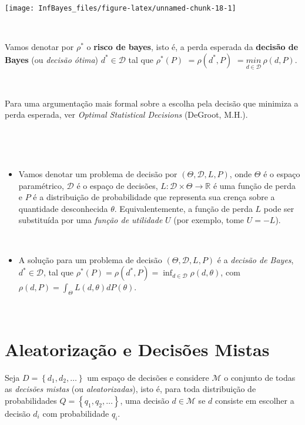 \documentclass[
]{book}
\providecommand{\tightlist}{%
  \setlength{\itemsep}{0pt}\setlength{\parskip}{0pt}}
\begin{document}
\begin{center}\texttt{[image: InfBayes\_files/figure-latex/unnamed-chunk-18-1]} \end{center}

\(~\)

Vamos denotar por \(\rho^*\) o \textbf{risco de bayes}, isto é, a perda esperada da \textbf{decisão de Bayes} (ou \emph{decisão ótima}) \(d^*\in \mathcal{D}\) tal que \(\rho^*(P)\) \(=\rho(d^*,P)\) \(=\underset{d\in\mathcal{D}}{min}~\rho(d,P)\).

\(~\)

Para uma argumentação mais formal sobre a escolha pela decisão que minimiza a perda esperada, ver \emph{Optimal Statistical Decisions} (DeGroot, M.H.).

\(~\)

\(~\)

\begin{itemize}
\tightlist
\item
  Vamos denotar um problema de decisão por \(\left(\Theta, \mathcal{D}, L, P\right)\), onde \(\Theta\) é o espaço paramétrico, \(\mathcal{D}\) é o espaço de decisões, \(L: \mathcal{D} \times \Theta \longrightarrow \mathbb{R}\) é uma função de perda e \(P\) é a distribuição de probabilidade que representa sua crença sobre a quantidade desconhecida \(\theta\). Equivalentemente, a função de perda \(L\) pode ser substituída por uma \emph{função de utilidade} \(U\) (por exemplo, tome \(U=-L\)).
\end{itemize}

\(~\)

\begin{itemize}
\tightlist
\item
  A solução para um problema de decisão \(\left(\Theta, \mathcal{D}, L, P\right)\) é a \emph{decisão de Bayes}, \({d}^* \in \mathcal{D}\), tal que \(\rho^*(P) = \rho({d}^*,P) = \displaystyle \inf_{d \in \mathcal{D}} \rho(d,\theta)\), com \(\rho(d,P) = \displaystyle \int_\Theta L(d,\theta)dP(\theta)\).
\end{itemize}

\(~\)

\hypertarget{Aleat}{%
\section{Aleatorização e Decisões Mistas}\label{Aleat}}

Seja \(D=\left\{d_1,d_2,\ldots\right\}\) um espaço de decisões e considere \(\mathcal{M}\) o conjunto de todas as \emph{decisões mistas} (ou \emph{aleatorizadas}), isto é, para toda distribuição de probabilidades \(Q=\left\{q_1,q_2,\ldots\right\}\), uma decisão \(d\in\mathcal{M}\) se \(d\) consiste em escolher a decisão \(d_i\) com probabilidade \(q_i\).
\end{document}
